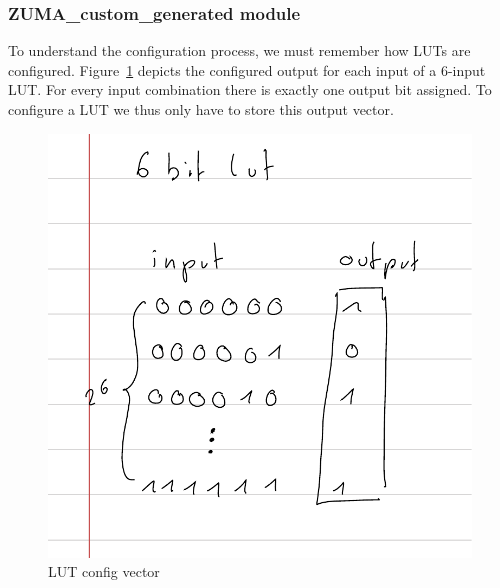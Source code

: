 \documentclass{article}
\begin{document}
\subsubsection{ZUMA\_custom\_generated module}
To understand the configuration process, we must remember how LUTs are configured.
Figure~\ref{fig:config_p1} depicts the configured output for each input of a \(6\)-input LUT. For every input combination there is exactly one output bit assigned. To configure a LUT we thus only have to store this output vector.
\begin{figure}[htbp]
    \centering
    \includegraphics[width=.4\textwidth]{Figures/configuration_part1.pdf}
    \caption{LUT config vector}
    \label{fig:config_p1}
\end{figure}
\end{document}
